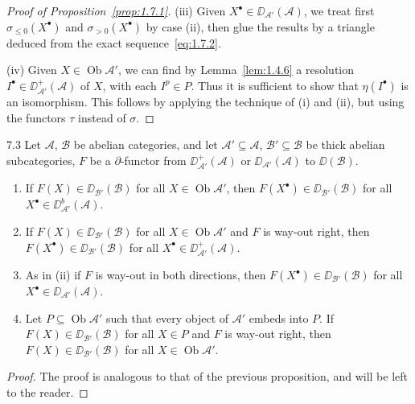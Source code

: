 \begin{proof}[Proof of Proposition~\ref{prop:1.7.1}]
(iii) Given $X^\bullet\in\DD_{\mathcal{A}'}(\mathcal{A})$, we treat first $\sigma_{\le 0}(X^\bullet)$ and $\sigma_{>0}(X^\bullet)$ by case (ii), then glue the results by a triangle deduced from the exact sequence~\eqref{eq:1.7.2}.

(iv) Given $X\in\operatorname{Ob}\mathcal{A}'$, we can find by Lemma~\ref{lem:1.4.6} a resolution $I^\bullet\in\DD_{\mathcal{A}'}^+(\mathcal{A})$ of $X$, with each $I^p\in P$. Thus it is sufficient to show that $\eta(I^\bullet)$ is an isomorphism. This follows by applying the technique of (i) and (ii), but using the functors $\tau$ instead of $\sigma$.
\end{proof}

\begin{bookproposition}{7.3}\label{prop:1.7.3}
Let $\mathcal{A}$, $\mathcal{B}$ be abelian categories, and let $\mathcal{A}'\subseteq\mathcal{A}$, $\mathcal{B}'\subseteq\mathcal{B}$ be thick abelian subcategories,
$F$ be a $\partial$-functor from $\DD_{\mathcal{A}'}^+(\mathcal{A})$ or $\DD_{\mathcal{A}'}(\mathcal{A})$ to $\DD(\mathcal{B})$.
\begin{enumerate}
\item[(i)] If $F(X)\in\DD_{\mathcal{B}'}(\mathcal{B})$ for all $X\in\operatorname{Ob}\mathcal{A}'$,
then $F(X^\bullet)\in\DD_{\mathcal{B}'}(\mathcal{B})$ for all $X^\bullet\in\DD_{\mathcal{A}'}^b(\mathcal{A})$.

\item[(ii)] If $F(X)\in\DD_{\mathcal{B}'}(\mathcal{B})$ for all $X\in\operatorname{Ob}\mathcal{A}'$
and $F$ is way-out right,
then $F(X^\bullet)\in\DD_{\mathcal{B}'}(\mathcal{B})$ for all $X^\bullet\in\DD_{\mathcal{A}'}^+(\mathcal{A})$.

\item[(iii)] As in (ii) if $F$ is way-out in both directions, then $F(X^\bullet)\in\DD_{\mathcal{B}'}(\mathcal{B})$ for all $X^\bullet\in\DD_{\mathcal{A}'}(\mathcal{A})$.

\item[(iv)] Let $P\subseteq\operatorname{Ob}\mathcal{A}'$ such that every object of $\mathcal{A}'$ embeds into $P$.
If $F(X)\in\DD_{\mathcal{B}'}(\mathcal{B})$ for all $X\in P$ and $F$ is way-out right,
then $F(X)\in\DD_{\mathcal{B}'}(\mathcal{B})$ for all $X\in\operatorname{Ob}\mathcal{A}'$.
\end{enumerate}
\end{bookproposition}

\begin{proof}
The proof is analogous to that of the previous
proposition, and will be left to the reader.
\end{proof}

